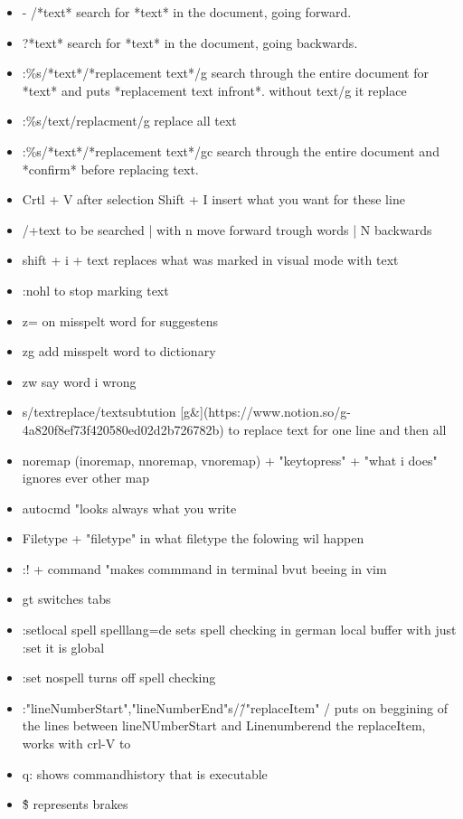 \documentclass[12pt]{article}
\begin{document}
\begin{itemize}
    \item - /*text* search for *text* in the document, going forward.
    \item ?*text* search for *text* in the document, going backwards.
    \item :\%s/*text*/*replacement text*/g search through the entire document for *text* and puts  *replacement text infront*. without text/g it replace
    \item :\%s/text/replacment/g replace all text
    \item :\%s/*text*/*replacement text*/gc search through the entire document and *confirm* before replacing text.
    \item Crtl + V after selection Shift + I insert what you want for these line
    \item /+text to be searched | with n move forward trough words | N backwards
    \item shift + i + text replaces what was marked in visual mode with text 
    \item :nohl to stop marking text
    \item z= on misspelt word for suggestens
    \item zg add misspelt word to dictionary
    \item zw say word i wrong  
    \item s/textreplace/textsubtution [g\&](https://www.notion.so/g-4a820f8ef73f420580ed02d2b726782b) to replace text for one line and then all
    \item noremap (inoremap, nnoremap, vnoremap) + "keytopress" + "what i does"  ignores ever other map 
    \item autocmd "looks always what you write
    \item Filetype + "filetype"  in what filetype the folowing wil happen
    \item :! + command "makes commmand in terminal bvut beeing in vim
    \item gt switches tabs
    \item :setlocal spell spelllang=de sets spell checking in german local buffer with just :set it is global
    \item :set nospell turns off spell checking
    \item :"lineNumberStart","lineNumberEnd"s/\^/"replaceItem" /  puts on beggining of the lines between lineNUmberStart and Linenumberend the replaceItem, works with crl-V to
    \item q: shows commandhistory that is executable
    \item \^\$ represents brakes
\end{itemize}
\end{document}
